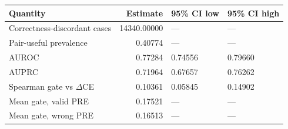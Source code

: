 \begin{tabular}{lrll}
\toprule
Quantity & Estimate & 95\% CI low & 95\% CI high \\
\midrule
Correctness-discordant cases & 14340.00000 & — & — \\
Pair-useful prevalence & 0.40774 & — & — \\
AUROC & 0.77284 & 0.74556 & 0.79660 \\
AUPRC & 0.71964 & 0.67657 & 0.76262 \\
Spearman gate vs \(\Delta\)CE & 0.10361 & 0.05845 & 0.14902 \\
Mean gate, valid PRE & 0.17521 & — & — \\
Mean gate, wrong PRE & 0.16513 & — & — \\
\bottomrule
\end{tabular}
